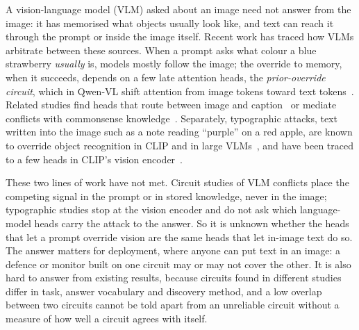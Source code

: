 \documentclass[letterpaper]{article}
\begin{document}
A vision-language model (VLM) asked about an image need not answer from the
image: it has memorised what objects usually look like, and text can reach it
through the prompt or inside the image itself. Recent work has traced how VLMs
arbitrate between these sources. When a prompt asks what colour a blue
strawberry \emph{usually} is, models mostly follow the image; the override to
memory, when it succeeds, depends on a few late attention heads, the
\emph{prior-override circuit}, which in Qwen-VL shift attention from image tokens toward text
tokens~\citep{lietzow2026}. Related studies find
heads that route between image and caption~\citep{hua2025} or mediate conflicts
with commonsense knowledge~\citep{ortu2025}. Separately, typographic attacks,
text written into the image such as a note reading ``purple'' on a red apple,
are known to override object recognition in CLIP and in large
VLMs~\citep{goh2021multimodal,cheng2024typodeceptions,westerhoff2025scam}, and
have been traced to a few heads in CLIP's vision
encoder~\citep{dyslexify2025,liu2026typographic}.

These two lines of work have not met. Circuit studies of VLM conflicts place the
competing signal in the prompt or in stored knowledge, never in the image;
typographic studies stop at the vision encoder and do not ask which language-model
heads carry the attack to the answer. So it is unknown whether the heads that let
a prompt override vision are the same heads that let in-image text do so. The
answer matters for deployment, where anyone can put text in an image: a defence
or monitor built on one circuit may or may not cover the other. It is also hard
to answer from existing results, because circuits found in different studies
differ in task, answer vocabulary and discovery method, and a low overlap
between two circuits cannot be told apart from an unreliable circuit without a
measure of how well a circuit agrees with itself.
\end{document}
